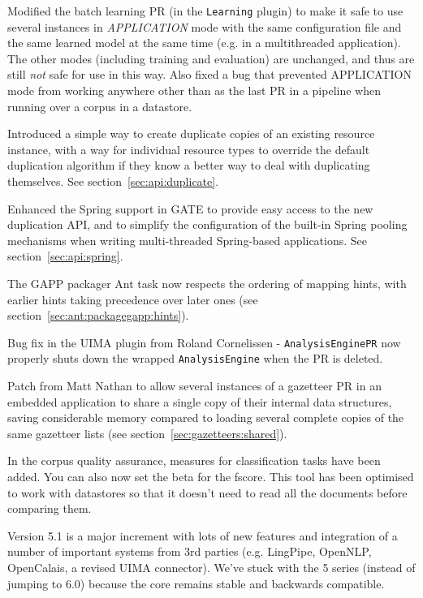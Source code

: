 Modified the batch learning PR (in the \texttt{Learning} plugin) to make it
safe to use several instances in {\it APPLICATION} mode with the same
configuration file and the same learned model at the same time (e.g. in a
multithreaded application).  The other modes (including training and
evaluation) are unchanged, and thus are still \emph{not} safe for use in this
way.  Also fixed a bug that prevented APPLICATION mode from working anywhere
other than as the last PR in a pipeline when running over a corpus in a
datastore.

Introduced a simple way to create duplicate copies of an existing resource
instance, with a way for individual resource types to override the default
duplication algorithm if they know a better way to deal with duplicating
themselves.  See section~\ref{sec:api:duplicate}.

Enhanced the Spring support in GATE to provide easy access to the new
duplication API, and to simplify the configuration of the built-in Spring
pooling mechanisms when writing multi-threaded Spring-based applications.  See
section~\ref{sec:api:spring}.

The GAPP packager Ant task now respects the ordering of mapping hints, with
earlier hints taking precedence over later ones (see
section~\ref{sec:ant:packagegapp:hints}).

Bug fix in the UIMA plugin from Roland Cornelissen - \texttt{AnalysisEnginePR}
now properly shuts down the wrapped \texttt{AnalysisEngine} when the PR is
deleted.

Patch from Matt Nathan to allow several instances of a gazetteer PR in an
embedded application to share a single copy of their internal data structures,
saving considerable memory compared to loading several complete copies of the
same gazetteer lists (see section~\ref{sec:gazetteers:shared}).

In the corpus quality assurance, measures for classification tasks have been
added. You can also now set the beta for the fscore. This tool has been
optimised to work with datastores so that it doesn't need to read all the
documents before comparing them.

\label{sec:changes:5.1b1}\label{sec:changes:5.1b2}

Version 5.1 is a major increment with lots of new features and integration of
a number of important systems from 3rd parties (e.g. LingPipe, OpenNLP,
OpenCalais, a revised UIMA connector). We've stuck with the 5 series (instead
of jumping to 6.0) because the core remains stable and backwards compatible.

